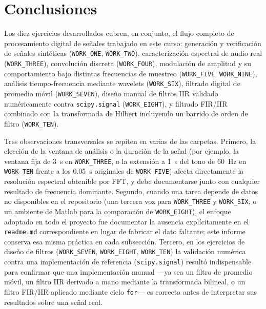 
\section{Conclusiones}
\label{sec:conclusiones}

Los diez ejercicios desarrollados cubren, en conjunto, el flujo completo
de procesamiento digital de señales trabajado en este curso: generación y
verificación de señales sintéticas (\texttt{WORK\_ONE}, \texttt{WORK\_TWO}),
caracterización espectral de audio real (\texttt{WORK\_THREE}),
convolución discreta (\texttt{WORK\_FOUR}), modulación de amplitud y su
comportamiento bajo distintas frecuencias de muestreo
(\texttt{WORK\_FIVE}, \texttt{WORK\_NINE}), análisis tiempo-frecuencia
mediante wavelets (\texttt{WORK\_SIX}), filtrado digital de promedio
móvil (\texttt{WORK\_SEVEN}), diseño manual de filtros IIR validado
numéricamente contra \texttt{scipy.signal} (\texttt{WORK\_EIGHT}), y
filtrado FIR/IIR combinado con la transformada de Hilbert incluyendo un
barrido de orden de filtro (\texttt{WORK\_TEN}).

Tres observaciones transversales se repiten en varias de las carpetas.
Primero, la elección de la ventana de análisis o la duración de la señal
(por ejemplo, la ventana fija de 3~s en \texttt{WORK\_THREE}, o la
extensión a 1~s del tono de 60~Hz en \texttt{WORK\_TEN} frente a los
0.05~s originales de \texttt{WORK\_FIVE}) afecta directamente la
resolución espectral obtenible por FFT, y debe documentarse junto con
cualquier resultado de frecuencia dominante. Segundo, cuando una tarea
depende de datos no disponibles en el repositorio (una tercera voz para
\texttt{WORK\_THREE} y \texttt{WORK\_SIX}, o un ambiente de Matlab para
la comparación de \texttt{WORK\_EIGHT}), el enfoque adoptado en todo el
proyecto fue documentar la ausencia explícitamente en el
\texttt{readme.md} correspondiente en lugar de fabricar el dato faltante;
este informe conserva esa misma práctica en cada subsección. Tercero, en
los ejercicios de diseño de filtros (\texttt{WORK\_SEVEN},
\texttt{WORK\_EIGHT}, \texttt{WORK\_TEN}) la validación numérica contra
una implementación de referencia (\texttt{scipy.signal}) resultó
indispensable para confirmar que una implementación manual —ya sea un
filtro de promedio móvil, un filtro IIR derivado a mano mediante la
transformada bilineal, o un filtro FIR/IIR aplicado mediante ciclo
\texttt{for}— es correcta antes de interpretar sus resultados sobre una
señal real.
